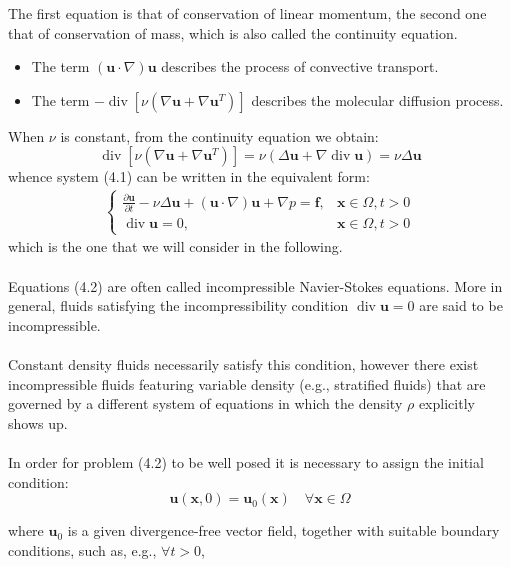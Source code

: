 \documentclass[11pt]{book}
\begin{document}
The first equation is that of conservation of linear momentum, the second one that of conservation of mass, which is also called the continuity equation.
\begin{itemize}
  \item The term $(\mathbf{u} \cdot \nabla) \mathbf{u}$ describes the process of convective transport.
  \item The term $-\operatorname{div}\left[\nu\left(\nabla \mathbf{u}+\nabla \mathbf{u}^{T}\right)\right]$ describes the molecular diffusion process.
\end{itemize}
When $\nu$ is constant, from the continuity equation we obtain:\\
$$
\operatorname{div}\left[\nu\left(\nabla \mathbf{u}+\nabla \mathbf{u}^{T}\right)\right]=\nu(\Delta \mathbf{u}+\nabla \operatorname{div} \mathbf{u})=\nu \Delta \mathbf{u}
$$
whence system (4.1) can be written in the equivalent form:
\begin{align}
\begin{cases}\frac{\partial \mathbf{u}}{\partial t}-\nu \Delta \mathbf{u}+(\mathbf{u} \cdot \nabla) \mathbf{u}+\nabla p=\mathbf{f}, & \mathbf{x} \in \Omega, t>0 \\ \operatorname{div} \mathbf{u}=0, & \mathbf{x} \in \Omega, t>0\end{cases}
\end{align}
which is the one that we will consider in the following.\\ \\
Equations (4.2) are often called incompressible Navier-Stokes equations. More in general, fluids satisfying the incompressibility condition  $ \operatorname{div}\mathbf{u}=0$ are said to be incompressible.\\ \\
Constant density fluids necessarily satisfy this condition, however there exist incompressible fluids featuring variable density (e.g., stratified fluids) that are governed by a different system of equations in which the density $\rho$ explicitly shows up.\\ \\
In order for problem (4.2) to be well posed it is necessary to assign the initial condition:
\begin{equation}
\mathbf{u}(\mathbf{x}, 0)=\mathbf{u}_{0}(\mathbf{x}) \quad \forall \mathbf{x} \in \Omega
\end{equation}

where $\mathbf{u}_{0}$ is a given divergence-free vector field, together with suitable boundary conditions, such as, e.g., $\forall t>0$,
\end{document}
